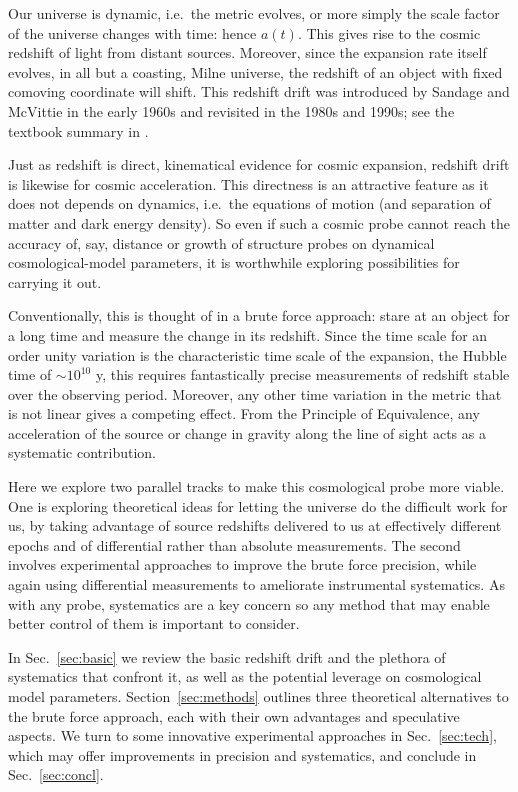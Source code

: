 \documentclass[preprint2, 10pt]{aastex}
\begin{document}
Our universe is dynamic, i.e.\ the metric evolves, or more simply the 
scale factor of the universe changes with time: hence $a(t)$.  This 
gives rise to the cosmic redshift of light from distant sources.  Moreover, 
since the expansion rate itself evolves, in all but a coasting, Milne 
universe, the redshift of an object with fixed comoving coordinate will shift.  This redshift drift was 
introduced by Sandage \citep{sandage} and McVittie \citep{mcvittie} in the 
early 1960s and revisited in the 1980s and 1990s; see the textbook 
summary in \citet{fpoc}. 

Just as redshift is direct, kinematical evidence for cosmic expansion, 
redshift drift is likewise for cosmic acceleration.  This directness is 
an attractive feature as it does not depends on dynamics, i.e.\ the equations 
of motion (and separation of matter and dark energy density). 
So even if such a cosmic probe cannot reach the 
accuracy of, say, distance or growth of structure probes on dynamical 
cosmological-model parameters, it is worthwhile exploring possibilities 
for carrying it out. 

Conventionally, this is thought of in a brute force approach: stare at an 
object for a long time and measure the change in its redshift.  
Since the time scale for an order unity variation is the characteristic 
time scale of the expansion, the Hubble time of $\sim10^{10}$ y, this 
requires fantastically precise measurements of redshift stable over the 
observing period.  Moreover, any other time variation in the metric that 
is not linear gives a competing effect.  From the Principle of Equivalence, 
any acceleration of the source or change in gravity along the line of sight 
acts as a systematic contribution. 

Here we explore two parallel tracks to make this cosmological probe more 
viable. One is exploring theoretical ideas for letting the universe do the 
difficult work for us, by taking advantage of source redshifts delivered 
to us at effectively different epochs and of differential rather than absolute 
measurements.  The second involves experimental approaches to improve the 
brute force precision, while again using differential measurements to 
ameliorate instrumental systematics. As with any probe, systematics are a 
key concern so any method that may enable better control of them is 
important to consider. 

In Sec.~\ref{sec:basic} we review the basic redshift drift and the plethora 
of systematics that confront it, as well as the potential leverage on 
cosmological model parameters.  Section~\ref{sec:methods} outlines three 
theoretical alternatives to the brute force approach, each with their own 
advantages and speculative aspects. 
We turn to some innovative experimental approaches in Sec.~\ref{sec:tech}, 
which may offer improvements in precision and systematics, and conclude in 
Sec.~\ref{sec:concl}. 
\end{document}
